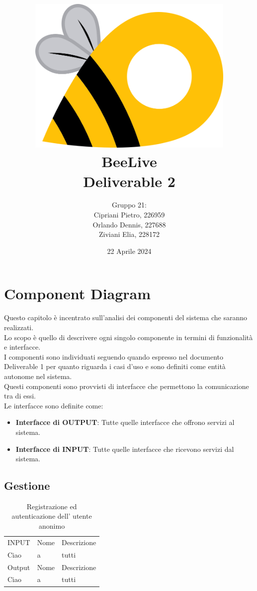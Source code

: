 \documentclass{article}
\title{\includegraphics[width=0.75\textwidth]{Images/BeeLive-Logo.png}\\\vspace{100pt}
\LARGE{\textbf{BeeLive\\Deliverable 2}}}
\author{Gruppo 21:\\
Cipriani Pietro, 226959\\
Orlando Dennis, 227688\\
Ziviani Elia, 228172}
\date{22 Aprile 2024}
\begin{document}
\maketitle
\thispagestyle{firstpage} %
\clearpage

\pagestyle{nonplain} %

\renewcommand{\contentsname}{Indice}
\tableofcontents

\clearpage

\section{Component Diagram}

Questo capitolo è incentrato sull'analisi dei componenti del sistema che saranno realizzati.\\
Lo scopo è quello di descrivere ogni singolo componente in termini di funzionalità e interfacce.\\

I componenti sono individuati seguendo quando espresso nel documento Deliverable 1 per quanto riguarda i casi d'uso e sono definiti come entità autonome nel sistema.\\
Questi componenti sono provvisti di interfacce che permettono la comunicazione tra di essi.\\
Le interfacce sono definite come:
\begin{itemize}
    \item \textbf{Interfacce di OUTPUT}: Tutte quelle interfacce che offrono servizi al sistema.
    \item \textbf{Interfacce di INPUT}: Tutte quelle interfacce che ricevono servizi dal sistema.
\end{itemize} 

\subsection{Gestione }

\begin{table}[htbp]
    \centering
    \begin{tabularx}{\textwidth}{| l | l | p{} |}
        \Xhline{2pt}
        INPUT & Nome & Descrizione \\
        \Xhline{2pt}
        Ciao & a & tutti \\
        \Xhline{2pt}
        Output & Nome & Descrizione \\
        \Xhline{2pt}
        Ciao & a & tutti \\
        \hline
    \end{tabularx}
    \caption{Registrazione ed autenticazione dell' utente anonimo}
\end{table}
\end{document}
